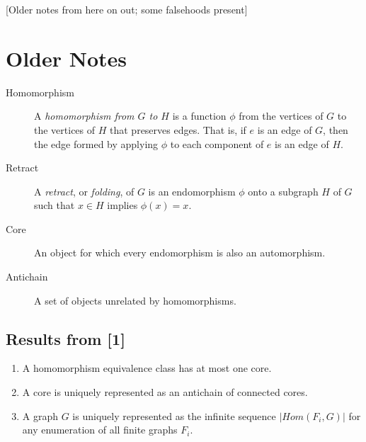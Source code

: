 \documentclass{article}
\begin{document}
[Older notes from here on out; some falsehoods present]
\section{Older Notes}

\begin{description}
\item[Homomorphism] A \emph{homomorphism from $G$ to $H$} is a
  function $\phi$ from the vertices of $G$ to the vertices of $H$ that
  preserves edges. That is, if $e$ is an edge of $G$, then the edge
  formed by applying $\phi$ to each component of $e$ is an edge of
  $H$.
\item[Retract] A \emph{retract}, or \emph{folding}, of $G$ is an
  endomorphism $\phi$ onto a subgraph $H$ of $G$ such that $x \in H$
  implies $\phi(x) = x$.
\item[Core] An object for which every endomorphism is also an
  automorphism.
\item[Antichain] A set of objects unrelated by homomorphisms.
\end{description}

\subsection{Results from [1]}
\begin{enumerate}
\item A homomorphism equivalence class has at most one core.
\item A core is uniquely represented as an antichain of connected
  cores.
\item A graph $G$ is uniquely represented as the infinite sequence
  $|Hom(F_i, G)|$ for any enumeration of all finite graphs $F_i$.
\end{enumerate}
\end{document}
